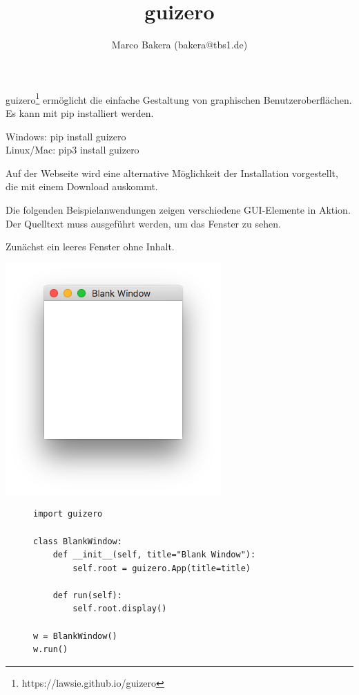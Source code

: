 \documentclass{tufte-handout}
\title{guizero}
\date{}
\author{Marco Bakera (bakera@tbs1.de)}
\begin{document}
\maketitle

guizero\footnote{https://lawsie.github.io/guizero} ermöglicht die einfache
Gestaltung von graphischen Benutzeroberflächen.
Es kann mit pip installiert werden.
\begin{marginfigure}
 Windows: pip install guizero\\ \noindent
 Linux/Mac: pip3 install guizero
\end{marginfigure}
  
Auf der Webseite wird eine alternative Möglichkeit der Installation
vorgestellt, die mit einem Download auskommt.
 
 
Die folgenden Beispielanwendungen zeigen verschiedene GUI-Elemente in Aktion.
Der Quelltext muss ausgeführt werden, um das Fenster zu sehen. 
 
Zunächst ein leeres Fenster ohne Inhalt.

\begin{marginfigure}[3cm]
	\includegraphics[width=\textwidth]{../blank_window}
\end{marginfigure}

\begin{figure}
\begin{lstlisting}
import guizero

class BlankWindow:
    def __init__(self, title="Blank Window"):
        self.root = guizero.App(title=title)

    def run(self):
        self.root.display()

w = BlankWindow()
w.run()
\end{lstlisting}
\end{figure} 
\end{document}
